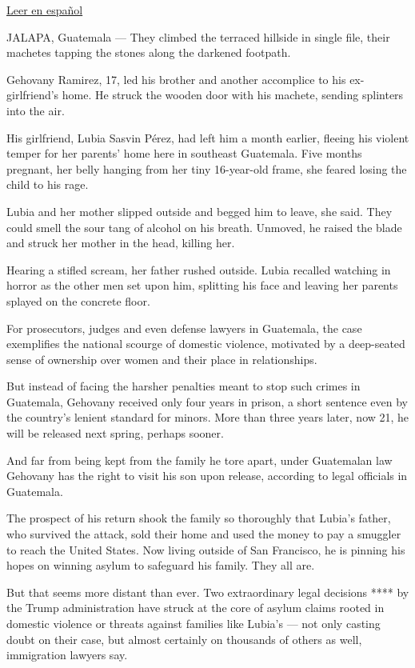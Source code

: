 \href{https://www.nytimes3xbfgragh.onion/es/2019/08/19/espanol/america-latina/guatemala-migrantes-mujeres-violencia.html}{Leer
en español}

JALAPA, Guatemala --- They climbed the terraced hillside in single file,
their machetes tapping the stones along the darkened footpath.

Gehovany Ramirez, 17, led his brother and another accomplice to his
ex-girlfriend's home. He struck the wooden door with his machete,
sending splinters into the air.

His girlfriend, Lubia Sasvin Pérez, had left him a month earlier,
fleeing his violent temper for her parents' home here in southeast
Guatemala. Five months pregnant, her belly hanging from her tiny
16-year-old frame, she feared losing the child to his rage.

Lubia and her mother slipped outside and begged him to leave, she said.
They could smell the sour tang of alcohol on his breath. Unmoved, he
raised the blade and struck her mother in the head, killing her.

Hearing a stifled scream, her father rushed outside. Lubia recalled
watching in horror as the other men set upon him, splitting his face and
leaving her parents splayed on the concrete floor.

For prosecutors, judges and even defense lawyers in Guatemala, the case
exemplifies the national scourge of domestic violence, motivated by a
deep-seated sense of ownership over women and their place in
relationships.

But instead of facing the harsher penalties meant to stop such crimes in
Guatemala, Gehovany received only four years in prison, a short sentence
even by the country's lenient standard for minors. More than three years
later, now 21, he will be released next spring, perhaps sooner.

And far from being kept from the family he tore apart, under Guatemalan
law Gehovany has the right to visit his son upon release, according to
legal officials in Guatemala.

The prospect of his return shook the family so thoroughly that Lubia's
father, who survived the attack, sold their home and used the money to
pay a smuggler to reach the United States. Now living outside of San
Francisco, he is pinning his hopes on winning asylum to safeguard his
family. They all are.

But that seems more distant than ever. Two extraordinary legal decisions
**** by the Trump administration have struck at the core of asylum
claims rooted in domestic violence or threats against families like
Lubia's --- not only casting doubt on their case, but almost certainly
on thousands of others as well, immigration lawyers say.

